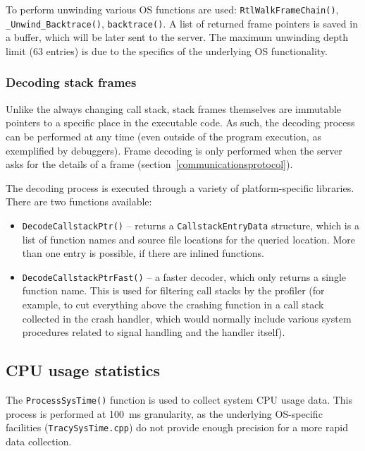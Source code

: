 \documentclass[hidelinks,titlepage,a4paper]{article}
\begin{document}
To perform unwinding various OS functions are used: \texttt{RtlWalkFrameChain()}, \texttt{\_Unwind\_Backtrace()}, \texttt{backtrace()}. A list of returned frame pointers is saved in a buffer, which will be later sent to the server. The maximum unwinding depth limit (63 entries) is due to the specifics of the underlying OS functionality.

\subsubsection{Decoding stack frames}

Unlike the always changing call stack, stack frames themselves are immutable pointers to a specific place in the executable code. As such, the decoding process can be performed at any time (even outside of the program execution, as exemplified by debuggers). Frame decoding is only performed when the server asks for the details of a frame (section~\ref{communicationsprotocol}).

The decoding process is executed through a variety of platform-specific libraries. There are two functions available:

\begin{itemize}
\item \texttt{DecodeCallstackPtr()} -- returns a \texttt{CallstackEntryData} structure, which is a list of function names and source file locations for the queried location. More than one entry is possible, if there are inlined functions.
\item \texttt{DecodeCallstackPtrFast()} -- a faster decoder, which only returns a single function name. This is used for filtering call stacks by the profiler (for example, to cut everything above the crashing function in a call stack collected in the crash handler, which would normally include various system procedures related to signal handling and the handler itself).
\end{itemize}

\subsection{CPU usage statistics}

The \texttt{ProcessSysTime()} function is used to collect system CPU usage data. This process is performed at 100~\si{\milli\second} granularity, as the underlying OS-specific facilities (\texttt{TracySysTime.cpp}) do not provide enough precision for a more rapid data collection.
\end{document}
